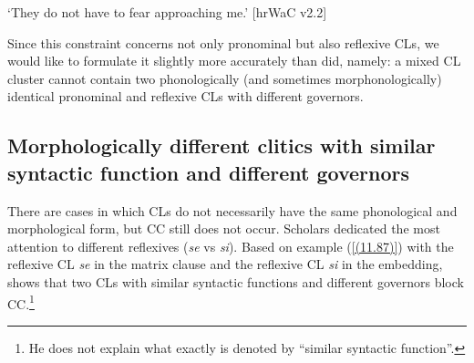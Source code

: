 \begin{exe}\ex
\begin{xlist}
\end{xlist}
\glt ‘They do not have to fear approaching me.’
\hfill [hrWaC v2.2]
\end{exe}

\noindent Since this constraint concerns not only pronominal but also reflexive CLs, we would like to formulate it slightly more accurately than \citet[123]{Hana07} did, namely: a mixed CL cluster cannot contain two phonologically (and sometimes morphonologically) identical pronominal and reflexive CLs with different governors.

\subsection{Morphologically different clitics with similar syntactic function and different governors}
\label{Morphologically different clitics with similar syntactic function and different governors}

There are cases in which CLs do not necessarily have the same phonological and morphological form, but CC still does not occur. Scholars dedicated the most attention to different reflexives (\textit{se} vs \textit{si}). Based on example (\ref{(11.87)}) with the reflexive CL \textit{se} in the matrix clause and the reflexive CL \textit{si} in the embedding, \citet[79]{Junghanns02} shows that two CLs with similar syntactic functions and different governors block CC.\footnote{He does not explain what exactly is denoted by “similar syntactic function”.}

